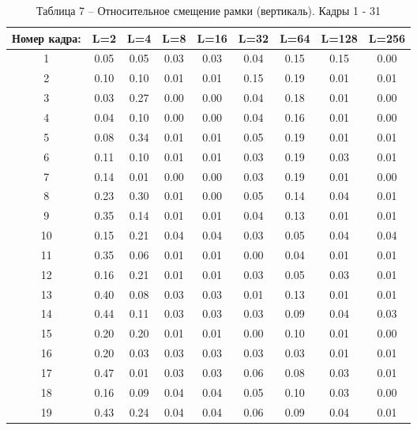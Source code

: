 \begin{table}[h!]
\caption*{Таблица 7 -- Относительное смещение рамки (вертикаль). Кадры 1 - 31}
\begin{tabular}{|c|c|c|c|c|c|c|c|c|}
\hline
Номер кадра: & L=2  & L=4  & L=8  & L=16 & L=32 & L=64 & L=128 & L=256 \\ \hline
1            & 0.05 & 0.05 & 0.03 & 0.03 & 0.04 & 0.15 & 0.15  & 0.00  \\ \hline
2            & 0.10 & 0.10 & 0.01 & 0.01 & 0.15 & 0.19 & 0.01  & 0.01  \\ \hline
3            & 0.03 & 0.27 & 0.00 & 0.00 & 0.04 & 0.18 & 0.01  & 0.00  \\ \hline
4            & 0.04 & 0.10 & 0.00 & 0.00 & 0.04 & 0.16 & 0.01  & 0.00  \\ \hline
5            & 0.08 & 0.34 & 0.01 & 0.01 & 0.05 & 0.19 & 0.01  & 0.01  \\ \hline
6            & 0.11 & 0.10 & 0.01 & 0.01 & 0.03 & 0.19 & 0.03  & 0.01  \\ \hline
7            & 0.14 & 0.01 & 0.00 & 0.00 & 0.03 & 0.19 & 0.01  & 0.00  \\ \hline
8            & 0.23 & 0.30 & 0.01 & 0.00 & 0.05 & 0.14 & 0.04  & 0.01  \\ \hline
9            & 0.35 & 0.14 & 0.01 & 0.01 & 0.04 & 0.13 & 0.01  & 0.01  \\ \hline
10           & 0.15 & 0.21 & 0.04 & 0.04 & 0.03 & 0.05 & 0.04  & 0.04  \\ \hline
11           & 0.35 & 0.06 & 0.01 & 0.01 & 0.00 & 0.04 & 0.01  & 0.01  \\ \hline
12           & 0.16 & 0.21 & 0.01 & 0.01 & 0.03 & 0.05 & 0.03  & 0.01  \\ \hline
13           & 0.40 & 0.08 & 0.03 & 0.03 & 0.01 & 0.13 & 0.01  & 0.01  \\ \hline
14           & 0.44 & 0.11 & 0.03 & 0.03 & 0.03 & 0.09 & 0.04  & 0.03  \\ \hline
15           & 0.20 & 0.20 & 0.01 & 0.01 & 0.00 & 0.10 & 0.01  & 0.00  \\ \hline
16           & 0.20 & 0.03 & 0.03 & 0.03 & 0.03 & 0.03 & 0.01  & 0.01  \\ \hline
17           & 0.47 & 0.01 & 0.03 & 0.03 & 0.06 & 0.08 & 0.03  & 0.01  \\ \hline
18           & 0.16 & 0.09 & 0.04 & 0.04 & 0.05 & 0.10 & 0.03  & 0.00  \\ \hline
19           & 0.43 & 0.24 & 0.04 & 0.04 & 0.06 & 0.09 & 0.04  & 0.01  \\ \hline

\end{tabular}
\end{table}
